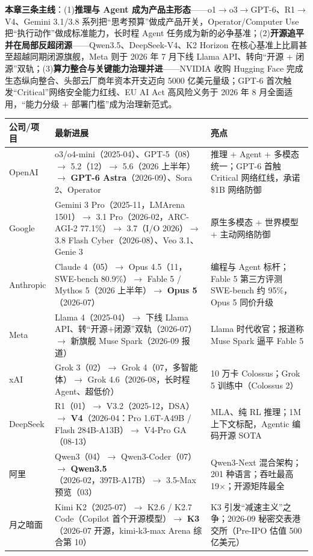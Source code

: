 \documentclass[12pt,a4paper]{article}
\begin{document}
\textbf{本章三条主线}：(1)\textbf{推理与 Agent 成为产品主形态}——o1$\to$o3$\to$GPT-6、R1$\to$V4、Gemini 3.1/3.8 系列把“思考预算”做成产品开关，Operator/Computer Use 把“执行动作”做成标准能力，长时程 Agent 任务成为新的必争基准；(2)\textbf{开源追平并在局部反超闭源}——Qwen3.5、DeepSeek-V4、K2 Horizon 在核心基准上比肩甚至超越同期闭源旗舰，Meta 则于 2026 年 7 月下线 Llama API、转向“开源 + 闭源”双轨；(3)\textbf{算力整合与关键能力治理并进}——NVIDIA 收购 Hugging Face 完成生态纵向整合、头部云厂商年资本开支迈向 5000 亿美元量级；GPT-6 首次触发“Critical”网络安全能力红线、EU AI Act 高风险义务于 2026 年 8 月全面适用，“能力分级 + 部署门槛”成为治理新范式。

\begin{table}[htbp]
\centering
\small
\begin{tabular}{@{}lp{6.2cm}p{4.4cm}@{}}
\toprule
\textbf{公司/项目} & \textbf{最新进展} & \textbf{亮点}\\
\midrule
OpenAI & o3/o4-mini（2025-04）、GPT-5（08）$\to$ 5.2（12）$\to$ 5.6（2026 上半年）$\to$ \textbf{GPT-6 Astra}（2026-09）、Sora 2、Operator & 推理 + Agent + 多模态统一；GPT-6 首触 Critical 网络红线，承诺 \$1B 网络防御\\
Google & Gemini 3 Pro（2025-11，LMArena 1501）$\to$ 3.1 Pro（2026-02，ARC-AGI-2 77.1\%）$\to$ 3.7（I/O 2026）$\to$ 3.8 Flash Cyber（2026-08）、Veo 3.1、Genie 3 & 原生多模态 + 世界模型 + 主动网络防御\\
Anthropic & Claude 4（05）$\to$ Opus 4.5（11，SWE-bench 80.9\%）$\to$ Fable 5 / Mythos 5（2026 上半年）$\to$ \textbf{Opus 5}（2026-07） & 编程与 Agent 标杆；Fable 5 第三方评测 SWE-bench 约 95\%，Opus 5 同价升级\\
Meta & Llama 4（2025-04）$\to$ 下线 Llama API、转“开源+闭源”双轨（2026-07）$\to$ 新旗舰 Muse Spark（2026-09 报道） & Llama 时代收官；报道称 Muse Spark 逼平 Fable 5\\
xAI & Grok 3（02）$\to$ Grok 4（07，多智能体）$\to$ Grok 4.6（2026-08，长时程 Agent、超低价） & 10 万卡 Colossus；Grok 5 训练中（Colossus 2）\\
DeepSeek & R1（01）$\to$ V3.2（2025-12，DSA）$\to$ \textbf{V4}（2026-04：Pro 1.6T-A49B / Flash 284B-A13B）$\to$ V4-Pro GA（08-13） & MLA、纯 RL 推理；1M 上下文标配，Agentic 编码开源 SOTA\\
阿里 & Qwen3（04）$\to$ Qwen3-Coder（07）$\to$ \textbf{Qwen3.5}（2026-02，397B-A17B）$\to$ 3.5-Max 预览（03） & Qwen3-Next 混合架构；201 种语言；吞吐最高 19$\times$；开源矩阵最全\\
月之暗面 & Kimi K2（2025-07）$\to$ K2.6 / K2.7 Code（Copilot 首个开源模型）$\to$ \textbf{K3}（2026-07 开源，kimi-k3-max Arena 综合第 10） & K3 引发“减速主义”之争；2026-09 秘密交表港交所（Pre-IPO 估值 500 亿美元）\\

\end{tabular}
\end{table}
\end{document}
